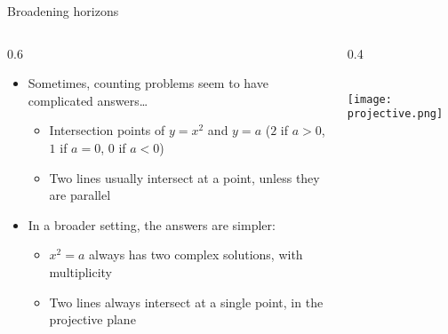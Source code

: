 \documentclass{beamer}
\theoremstyle{definition}
\begin{document}
                                                \begin{frame}{Broadening horizons}

      \begin{columns}[c]
        \begin{column}{0.6\hsize}
      
          \begin{itemize}
          \item Sometimes, counting problems seem to have complicated answers\dots
            \begin{itemize}
            \item Intersection points of $y = x^2$ and $y=a$ ($2$ if $a>0$,
              $1$ if $a=0$, $0$ if $a<0$)
              \item Two lines usually intersect at a point, unless they are parallel
            \end{itemize}
          \item In a broader setting, the answers are simpler:
            \begin{itemize}
            \item $x^2=a$ always has two complex solutions, with multiplicity
            \item Two lines always intersect at a single point, in the
              projective plane
            \end{itemize}
          \end{itemize}
        \end{column}
        \begin{column}{0.4\hsize}


          ~\\
          \texttt{[image: projective.png]}

        \end{column}
      \end{columns}
                                                \end{frame}
\end{document}
